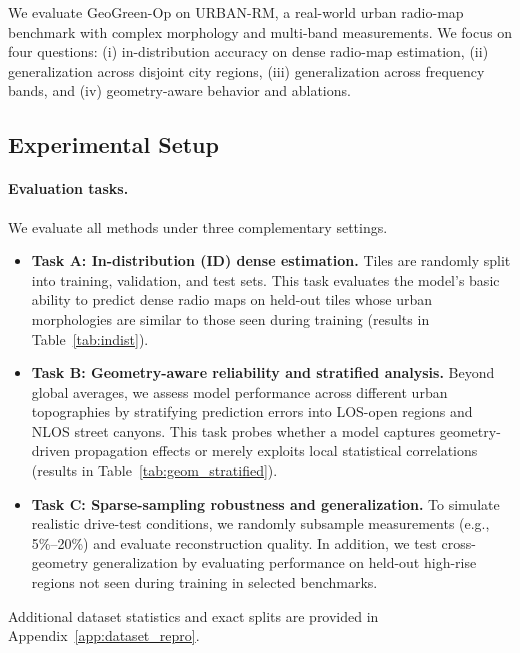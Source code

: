 \documentclass{article}
\begin{document}
We evaluate GeoGreen-Op on URBAN-RM, a real-world urban radio-map benchmark
with complex morphology and multi-band measurements.
We focus on four questions:
(i) in-distribution accuracy on dense radio-map estimation,
(ii) generalization across disjoint city regions,
(iii) generalization across frequency bands, and
(iv) geometry-aware behavior and ablations.



\subsection{Experimental Setup}
\label{sec:exp_setup}

\paragraph{Evaluation tasks.}
We evaluate all methods under three complementary settings.

\begin{itemize}[leftmargin=1.5em, itemsep=0.2em]
    \item \textbf{Task A: In-distribution (ID) dense estimation.}
    Tiles are randomly split into training, validation, and test sets. This task evaluates the model’s basic ability to predict dense radio maps on held-out tiles whose urban morphologies are similar to those seen during training (results in Table~\ref{tab:indist}).
    
    \item \textbf{Task B: Geometry-aware reliability and stratified analysis.}
    Beyond global averages, we assess model performance across different urban topographies by stratifying prediction errors into LOS-open regions and NLOS street canyons. This task probes whether a model captures geometry-driven propagation effects or merely exploits local statistical correlations (results in Table~\ref{tab:geom_stratified}).
    
    \item \textbf{Task C: Sparse-sampling robustness and generalization.}
    To simulate realistic drive-test conditions, we randomly subsample measurements (e.g., 5\%--20\%) and evaluate reconstruction quality. In addition, we test cross-geometry generalization by evaluating performance on held-out high-rise regions not seen during training in selected benchmarks.
\end{itemize}

Additional dataset statistics and exact splits are provided in
Appendix~\ref{app:dataset_repro}.
\end{document}

